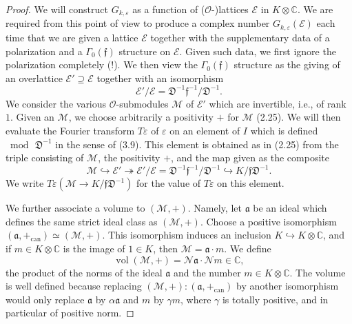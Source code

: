 \documentclass[12pt,a4paper]{article}
\theoremstyle{plain}
\theoremstyle{definition}
\theoremstyle{remark}
\DeclareMathOperator{\vol}{vol}
\begin{document}
\begin{proof}
We will construct $G_{k,\varepsilon}$ as a function of ($\mathcal{O}$-)lattices $\mathcal{E}$ in $K \otimes \mathbb{C}$. We are required from this point of view to produce a complex number $G_{k,\varepsilon}(\mathcal{E})$ each time that we are given a lattice $\mathcal{E}$ together with the supplementary data of a polarization and a $\Gamma_0(\mathfrak{f})$ structure on $\mathcal{E}$. Given such data, we first ignore the polarization completely (!). We then view the $\Gamma_0(\mathfrak{f})$ structure as the giving of an overlattice $\mathcal{E}' \supseteq \mathcal{E}$ together with an isomorphism
\[
\mathcal{E}'/\mathcal{E} = \mathfrak{D}^{-1}\mathfrak{f}^{-1}/\mathfrak{D}^{-1}.
\]
We consider the various $\mathcal{O}$-submodules $\mathscr{M}$ of $\mathcal{E}'$ which are invertible, i.e., of rank $1$. Given an $\mathscr{M}$, we choose arbitrarily a positivity $+$ for $\mathscr{M}$ (2.25). We will then evaluate the Fourier transform $T\varepsilon$ of $\varepsilon$ on an element of $I$ which is defined $\bmod\, \mathfrak{D}^{-1}$ in the sense of (3.9). This element is obtained as in (2.25) from the triple consisting of $\mathscr{M}$, the positivity $+$, and the map given as the composite
\[
\mathscr{M} \hookrightarrow \mathcal{E}' \twoheadrightarrow \mathcal{E}'/\mathcal{E} = \mathfrak{D}^{-1}\mathfrak{f}^{-1}/\mathfrak{D}^{-1} \hookrightarrow K/\mathfrak{f}\mathfrak{D}^{-1}.
\]
We write $T\varepsilon(\mathscr{M} \to K/\mathfrak{f}\mathfrak{D}^{-1})$ for the value of $T\varepsilon$ on this element.

We further associate a volume to $(\mathscr{M}, +)$. Namely, let $\mathfrak{a}$ be an ideal which defines the same strict ideal class as $(\mathscr{M}, +)$. Choose a positive isomorphism $(\mathfrak{a}, +_{\mathrm{can}}) \simeq (\mathscr{M}, +)$. This isomorphism induces an inclusion $K \hookrightarrow K \otimes \mathbb{C}$, and if $m \in K \otimes \mathbb{C}$ is the image of $1 \in K$, then $\mathscr{M} = \mathfrak{a} \cdot m$. We define
\[
\vol(\mathscr{M}, +) = \mathcal{N}\mathfrak{a} \cdot \mathcal{N}m \in \mathbb{C},
\]
the product of the norms of the ideal $\mathfrak{a}$ and the number $m \in K \otimes \mathbb{C}$. The volume is well defined because replacing $(\mathscr{M}, +):(\mathfrak{a}, +_{\mathrm{can}})$ by another isomorphism would only replace $\mathfrak{a}$ by $\alpha\mathfrak{a}$ and $m$ by $\gamma m$, where $\gamma$ is totally positive, and in particular of positive norm.


\end{proof}
\end{document}
